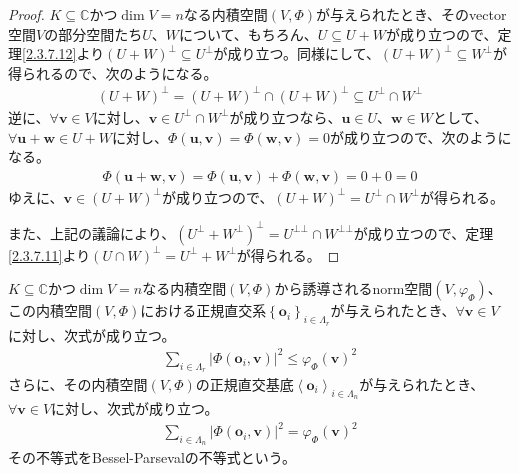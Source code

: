\documentclass[dvipdfmx]{jsarticle}
\begin{document}
\begin{proof}
$K \subseteq \mathbb{C}$かつ$\dim V = n$なる内積空間$(V,\varPhi )$が与えられたとき、そのvector空間$V$の部分空間たち$U$、$W$について、もちろん、$U \subseteq U + W$が成り立つので、定理\ref{2.3.7.12}より$(U + W)^{\bot} \subseteq U^{\bot}$が成り立つ。同様にして、$(U + W)^{\bot} \subseteq W^{\bot}$が得られるので、次のようになる。
\begin{align*}
(U + W)^{\bot} = (U + W)^{\bot} \cap (U + W)^{\bot} \subseteq U^{\bot} \cap W^{\bot}
\end{align*}
逆に、$\forall\mathbf{v} \in V$に対し、$\mathbf{v} \in U^{\bot} \cap W^{\bot}$が成り立つなら、$\mathbf{u} \in U$、$\mathbf{w} \in W$として、$\forall\mathbf{u} + \mathbf{w} \in U + W$に対し、$\varPhi \left( \mathbf{u},\mathbf{v} \right) = \varPhi \left( \mathbf{w},\mathbf{v} \right) = 0$が成り立つので、次のようになる。
\begin{align*}
\varPhi \left( \mathbf{u} + \mathbf{w},\mathbf{v} \right) = \varPhi \left( \mathbf{u},\mathbf{v} \right) + \varPhi \left( \mathbf{w},\mathbf{v} \right) = 0 + 0 = 0
\end{align*}
ゆえに、$\mathbf{v} \in (U + W)^{\bot}$が成り立つので、$(U + W)^{\bot} = U^{\bot} \cap W^{\bot}$が得られる。\par
また、上記の議論により、$\left( U^{\bot} + W^{\bot} \right)^{\bot} = U^{\bot\bot} \cap W^{\bot\bot}$が成り立つので、定理\ref{2.3.7.11}より$(U \cap W)^{\bot} = U^{\bot} + W^{\bot}$が得られる。
\end{proof}
\begin{thm}\label{2.3.7.14}
$K \subseteq \mathbb{C}$かつ$\dim V = n$なる内積空間$(V,\varPhi )$から誘導されるnorm空間$\left( V,\varphi_{\varPhi } \right)$、この内積空間$(V,\varPhi )$における正規直交系$\left\{ \mathbf{o}_{i} \right\}_{i \in \varLambda_{r}}$が与えられたとき、$\forall\mathbf{v} \in V$に対し、次式が成り立つ。
\begin{align*}
\sum_{i \in \varLambda_{r}} \left| \varPhi \left( \mathbf{o}_{i},\mathbf{v} \right) \right|^{2} \leq {\varphi_{\varPhi }\left( \mathbf{v} \right)}^{2}
\end{align*}
さらに、その内積空間$(V,\varPhi )$の正規直交基底$\left\langle \mathbf{o}_{i} \right\rangle_{i \in \varLambda_{n}}$が与えられたとき、$\forall\mathbf{v} \in V$に対し、次式が成り立つ。
\begin{align*}
\sum_{i \in \varLambda_{n}} \left| \varPhi \left( \mathbf{o}_{i},\mathbf{v} \right) \right|^{2} = {\varphi_{\varPhi }\left( \mathbf{v} \right)}^{2}
\end{align*}
その不等式をBessel-Parsevalの不等式という。
\end{thm}
\end{document}
